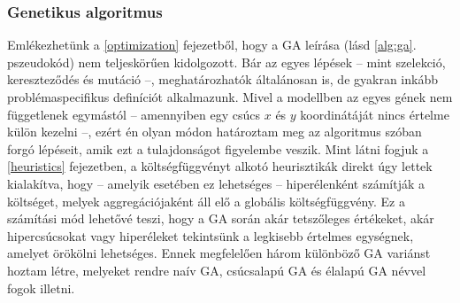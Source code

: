 


\subsubsection{Genetikus algoritmus}

Emlékezhetünk a \ref{optimization} fejezetből, hogy a GA leírása (lásd \ref{alg:ga}. pszeudokód) nem teljeskörűen kidolgozott. Bár az egyes lépések -- mint szelekció, kereszteződés és mutáció --, meghatározhatók általánosan is, de gyakran inkább problémaspecifikus definíciót alkalmazunk. Mivel a modellben az egyes gének nem függetlenek egymástól -- amennyiben egy csúcs $x$ és $y$ koordinátáját nincs értelme külön kezelni --, ezért én olyan módon határoztam meg az algoritmus szóban forgó lépéseit, amik ezt a tulajdonságot figyelembe veszik. Mint látni fogjuk a \ref{heuristics} fejezetben, a költségfüggvényt alkotó heurisztikák direkt úgy lettek kialakítva, hogy -- amelyik esetében ez lehetséges -- hiperélenként számítják a költséget, melyek aggregációjaként áll elő a globális költségfüggvény. Ez a számítási mód lehetővé teszi, hogy a GA során akár tetszőleges értékeket, akár hipercsúcsokat vagy hiperéleket tekintsünk a legkisebb értelmes egységnek, amelyet örökölni lehetséges. Ennek megfelelően három különböző GA variánst hoztam létre, melyeket rendre naív GA, csúcsalapú GA és élalapú GA névvel fogok illetni.

